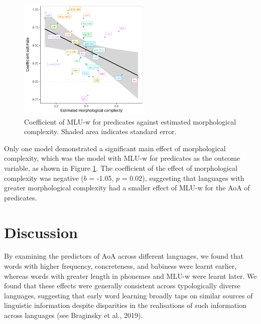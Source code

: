 \documentclass[10pt, letterpaper]{article}
\newenvironment{CodeChunk}{}{}
\begin{document}
\begin{CodeChunk}
\begin{figure}[ht]

{\centering \includegraphics[width=240px]{figs/mlu_pred-1} 

}

\caption[Coefficient of MLU-w for predicates against estimated morphological complexity]{Coefficient of MLU-w for predicates against estimated morphological complexity. Shaded area indicates standard error.}\label{fig:mlu_pred}
\end{figure}
\end{CodeChunk}

Only one model demonstrated a significant main effect of morphological
complexity, which was the model with MLU-w for predicates as the outcome
variable, as shown in Figure \ref{fig:mlu_pred}. The coefficient of the
effect of morphological complexity was negative (\(b\) = -1.05, \(p\) =
0.02), suggesting that languages with greater morphological complexity
had a smaller effect of MLU-w for the AoA of predicates.

\hypertarget{discussion}{%
\section{Discussion}\label{discussion}}

By examining the predictors of AoA across different languages, we found
that words with higher frequency, concreteness, and babiness were learnt
earlier, whereas words with greater length in phonemes and MLU-w were
learnt later. We found that these effects were generally consistent
across typologically diverse languages, suggesting that early word
learning broadly taps on similar sources of linguistic information
despite disparities in the realisations of such information across
languages (see Braginsky et al., 2019).
\end{document}
